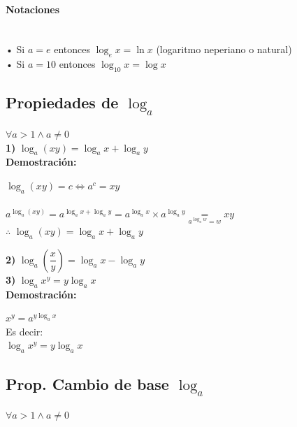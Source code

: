 \paragraph{Notaciones}
\qquad \\

• Si $a=e$ entonces $\log _e x = \ln x$ (logaritmo neperiano o natural)\\

• Si $a=10$ entonces $\log _{10} x = \log x$

\subsection{Propiedades de $\log _a$}

$\forall a >1 \wedge a \neq 0$\\

\qquad \textbf{1)} $\log _a (xy) = \log _a x + \log _a y$\\

\qquad \quad \textbf{Demostración:}
\begin{center}
$\log _a (xy) = c \Leftrightarrow a^c = xy$\\
\qquad \\

$a^{\log _a (xy)} = a^{\log _a x + \log _a y} = a^{\log _a x} \times a^{\log _a y} \underset{a^{\log _a w}= w}{=} xy$\\

\qquad $\therefore$ $\log _a (xy) = \log _a x + \log _a y$
\end{center}

\qquad \textbf{2)} $\log _a \left(\dfrac{x}{y} \right) = \log _a x - \log _a y$\\

\qquad \textbf{3)} $\log _a x^y = y \log _a x$ \\

\qquad \quad \textbf{Demostración:}
\begin{center}
$x^y = a^{ y \log _a x}$\\
Es decir:\\
 $\log _a x^y = y \log _a x$\\
\end{center}

\subsection{Prop. Cambio de base $\log _a$}

$\forall a >1 \wedge a \neq 0$\\

